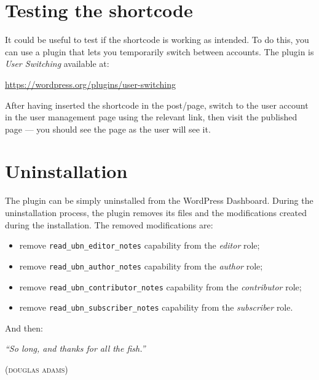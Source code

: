 \section{Testing the shortcode}

It could be useful to test if the shortcode is working as intended. To do this,
you can use a plugin that lets you temporarily switch between accounts. The
plugin is \textit{User Switching} available at:
\begin{center}
  \url{https://wordpress.org/plugins/user-switching}
\end{center}

After having inserted the shortcode in the post/page, switch to the user account
in the user management page using the relevant link, then visit the published
page --- you should see the page as the user will see it.

\section{Uninstallation}

The plugin can be simply uninstalled from the WordPress Dashboard. During the
uninstallation process, the plugin removes its files and the modifications
created during the installation. The removed modifications are:

\begin{itemize}
  \item remove \texttt{read\_ubn\_editor\_notes} capability from the \emph{editor} role;
  \item remove \texttt{read\_ubn\_author\_notes} capability from the \emph{author} role;
  \item remove \texttt{read\_ubn\_contributor\_notes} capability from the \emph{contributor} role;
  \item remove \texttt{read\_ubn\_subscriber\_notes} capability from the \emph{subscriber} role.
\end{itemize}

And then:

\begin{center}
  \textit{``So long, and thanks for all the fish.''}

  (\textsc{douglas adams})
\end{center}
